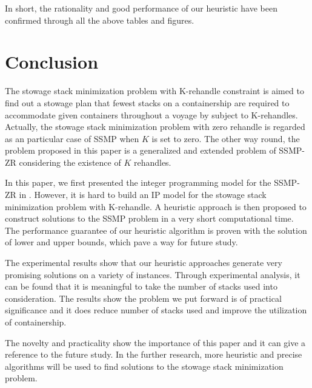 \documentclass[review,3p,times,authoryear,12pt]{elsarticle}
\begin{document}
In short, the rationality and good performance of our heuristic have been confirmed through all the above tables and figures.

\section{Conclusion}
\label{sec:con}
The stowage stack minimization problem with K-rehandle constraint is aimed to find out a stowage plan that fewest stacks on a containership are required to accommodate given containers throughout a voyage by subject to K-rehandles.
Actually, the stowage stack minimization problem with zero rehandle is regarded as an particular case of SSMP when $K$ is set to zero.
The other way round, the problem proposed in this paper is a generalized and extended problem of SSMP-ZR considering the existence of $K$ rehandles.

In this paper, we first presented the integer programming model for the SSMP-ZR in \cite{wang2014stowage}.
However, it is hard to build an IP model for the stowage stack minimization problem with K-rehandle.
A heuristic approach is then proposed to construct solutions to the SSMP problem in a very short computational time.
The performance guarantee of our heuristic algorithm is proven with the solution of lower and upper bounds, which pave a way for future study.

The experimental results show that our heuristic approaches generate very promising solutions on a variety of instances.
Through experimental analysis, it can be found that it is meaningful to take the number of stacks used into consideration.
The results show the problem we put forward is of practical significance and it does reduce number of stacks used and improve the utilization of containership.

The novelty and practicality show the importance of this paper and it can give a reference to the future study.
In the further research, more heuristic and precise algorithms will be used to find solutions to the stowage stack minimization problem.



\end{document}
